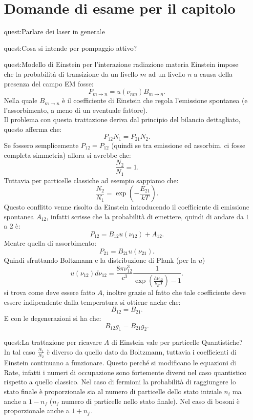 \clearpage 
\section*{Domande di esame per il capitolo}%
\begin{quest}{quest:Parlare dei laser in generale}
\end{quest}
\begin{quest}{quest:Cosa si intende per pompaggio attivo?}
\end{quest}
\begin{quest}{quest:Modello di Einstein per l'interazione radiazione materia}
Einstein impose che la probabilità di transizione da un livello $m$ ad un livello $n$ a causa della presenza del campo EM fosse:
\[
    P_{m\to n} = u(\nu_{nm}) B_{m\to n}
.\] 
Nella quale $B_{m\to n}$ è il coefficiente di Einstein che regola l'emissione spontanea (e l'assorbimento, a meno di un eventuale fattore).\\
Il problema con questa trattazione deriva dal principio del bilancio dettagliato, questo afferma che:
\[
    P_{12}N_1=P_{21}N_2
.\] 
Se fossero semplicemente $P_{12}=P_{12}$  (quindi se tra emissione ed assorbim. ci fosse completa simmetria) allora si avrebbe che:
\[
    \frac{N_2}{N_1}=1
.\] 
Tuttavia per particelle classiche ad esempio sappiamo che:
\[
    \frac{N_2}{N_1} = \exp\left(-\frac{E_{21}}{kT}\right)
.\] 
Questo conflitto venne risolto da Einstein introducendo il coefficiente di emissione spontanea $A_{12}$, infatti scrisse che la probabilità di emettere, quindi di andare da $1$ a $2$ è:
\[
    P_{12}=B_{12}u(\nu_{12}) + A_{12}
.\] 
Mentre quella di assorbimento:
\[
    P_{21} = B_{21}u(\nu_{21}) 
.\] 
Quindi sfruttando Boltzmann e la distribuzione di Plank (per la $u$)
\[
    u(\nu_{12}) d\nu_{12}  = \frac{8\pi\nu_{12}^3}{c^3}\frac{1}{\exp\left(\frac{h\nu_{12}}{k_BT}\right)-1}
.\]  
si trova come deve essere fatto $A$, inoltre grazie al fatto che tale coefficiente deve essere indipendente dalla temperatura si ottiene anche che:
\[
    B_{12}=B_{21}
.\] 
E con le degenerazioni si ha che:
\[
    B_{12}g_1= B_{21}g_2
.\] 
\end{quest}
\begin{quest}{quest:La trattazione per ricavare $A$ di Einstein vale per particelle Quantistiche?}
In tal caso $\frac{N_1}{N_2}$ è diverso da quello dato da Boltzmann, tuttavia i coefficienti di Einstein continuano a funzionare.
Questo perché si modificano le equazioni di Rate, infatti i numeri di occupazione sono fortemente diversi nel caso quantistico rispetto a quello classico. Nel caso di fermioni la probabilità di raggiungere lo stato finale è proporzionale sia al numero di particelle dello stato iniziale $n_i$ ma anche a $1-n_f$ ($n_f$ numero di particelle nello stato finale). Nel caso di bosoni è proporzionale anche a $1+n_f$.
\end{quest}
